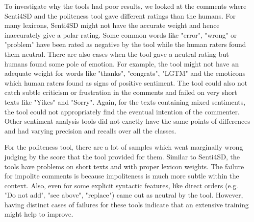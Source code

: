 To investigate why the tools had poor results, 
we looked at the comments where
Senti4SD and the politeness tool
gave different ratings than the humans.
For many lexicons, 
Senti4SD might not have the accurate weight 
and hence inaccurately give a polar rating. 
Some common words like "error", "wrong" or "problem" 
have been rated as negative by the tool 
while the human raters found them neutral. 
There are also cases when the tool gave a neutral rating 
but humans found some pole of emotion. 
For example, the tool might not have an adequate weight 
for words like "thanks", "congrats", "LGTM" 
and the emoticons which human raters found 
as signs of positive sentiment. 
The tool could also not catch 
subtle criticism or frustration in the comments and 
failed on very short texts like 
"Yikes" and "Sorry". 
Again, for the texts containing mixed sentiments, 
the tool could not appropriately find 
the eventual intention of the commenter. 
Other sentiment analysis tools did not 
exactly have the same points of differences 
and had varying precision and recalls over all the classes. 

For the politeness tool, 
there are a lot of samples 
which went marginally wrong 
judging by the score that the tool provided for them.
Similar to Senti4SD, the tools have problems
on short texts and
with proper lexicon weights. 
The failure for impolite comments is because 
impoliteness is much more subtle within the context. 
Also, even for some explicit syntactic features, 
like direct orders (e.g. "Do not add", "see above", "replace") 
came out as neutral by the tool. 
However, having distinct cases of failures for these tools 
indicate that an extensive training might help to improve.

